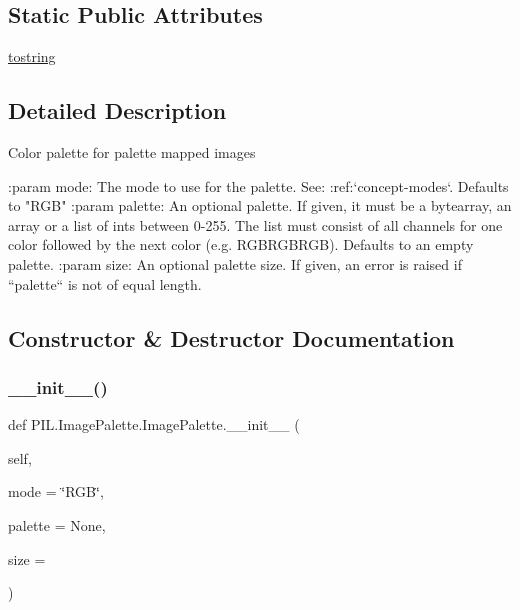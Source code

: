 \subsection*{Static Public Attributes}
\begin{DoxyCompactItemize}
\item 
\hyperlink{classPIL_1_1ImagePalette_1_1ImagePalette_aba886925536ea1443865d0eb894cefd7}{tostring}
\end{DoxyCompactItemize}


\subsection{Detailed Description}
\begin{DoxyVerb}Color palette for palette mapped images

:param mode: The mode to use for the palette. See:
    :ref:`concept-modes`. Defaults to "RGB"
:param palette: An optional palette. If given, it must be a bytearray,
    an array or a list of ints between 0-255. The list must consist of
    all channels for one color followed by the next color (e.g. RGBRGBRGB).
    Defaults to an empty palette.
:param size: An optional palette size. If given, an error is raised
    if ``palette`` is not of equal length.
\end{DoxyVerb}
 

\subsection{Constructor \& Destructor Documentation}
\mbox{\label{classPIL_1_1ImagePalette_1_1ImagePalette_a52d292bfd5557fd362429e1716a49cd7}} 
\subsubsection{\texorpdfstring{\+\_\+\+\_\+init\+\_\+\+\_\+()}{\_\_init\_\_()}}
{\footnotesize\ttfamily def P\+I\+L.\+Image\+Palette.\+Image\+Palette.\+\_\+\+\_\+init\+\_\+\+\_\+ (\begin{DoxyParamCaption}\item[{}]{self,  }\item[{}]{mode = {\ttfamily \char`\"{}RGB\char`\"{}},  }\item[{}]{palette = {\ttfamily None},  }\item[{}]{size = {} }\end{DoxyParamCaption})}



